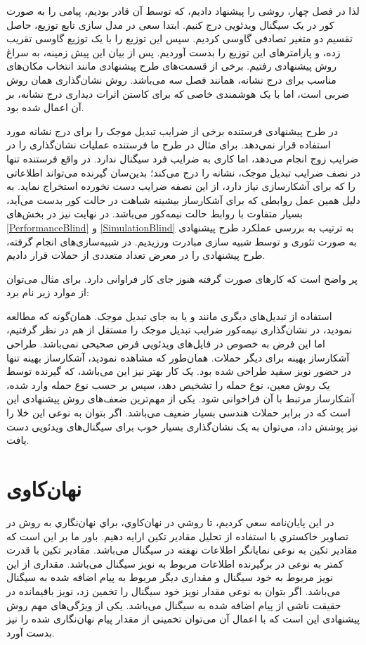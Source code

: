 لذا در فصل چهار، روشی را پیشنهاد دادیم، که توسط آن قادر بودیم، پیامی را به صورت کور در یک سیگنال ویدئویی درج کنیم. ابتدا سعی در مدل سازی تابع توزیع، حاصل تقسیم دو متغیر تصادفی گاوسی کردیم. سپس  این توزیع را با یک توزیع گاوسی تقریب زده، و پارامترهای این توزیع را بدست آوردیم. پس از بیان این پیش زمینه، به سراغ روش پیشنهادی رفتیم. برخی از قسمت‌های طرح پیشنهادی مانند انتخاب مکان‌های مناسب برای درج نشانه، همانند فصل سه می‌باشد. روش نشان‌گذاری همان روش ضربی است، اما با یک هوشمندی خاصی که برای کاستن اثرات دیداری درج نشانه، بر آن اعمال شده بود.

در طرح پیشنهادی فرستنده برخی از ضرایب تبدیل موجک را برای درج نشانه مورد استفاده قرار نمی‌دهد. برای مثال در طرح ما فرستنده عملیات نشان‌گذاری را در ضرایب زوج انجام می‌دهد، اما کاری به ضرایب فرد سیگنال ندارد. در واقع  فرستنده تنها در نصف ضرایب تبدیل موجک، نشانه را درج می‌کند؛ بدین‌سان گیرنده می‌تواند اطلاعاتی را که برای آشکارسازی نیاز دارد، از این نصفه ضرایب دست نخورده استخراج نماید. به دلیل همین عمل روابطی که برای آشکارساز بیشینه شباهت در حالت کور بدست می‌آید، بسیار متفاوت با روابط حالت نیمه‌کور می‌باشد. 
در نهایت نیز در بخش‌های {\ref{PerformanceBlind}} و {\ref{SimulationBlind}} به ترتیب به بررسی عملکرد طرح پیشنهادی به صورت تئوری و توسط شبیه سازی مبادرت ورزیدیم. در شبیه‌سازی‌های انجام گرفته، طرح پیشنهادی را در معرض تعداد متعددی از حملات قرار دادیم. 

پر واضح است که کارهای صورت گرفته هنوز جای کار فراوانی دارد. برای مثال می‌توان از موارد زیر نام برد:
\begin{itemize}
\incl
استفاده از تبدیل‌های دیگری مانند {} و یا {} به جای تبدیل موجک.
\incl
همان‌گونه که مطالعه نمودید، در نشان‌گذاری نیمه‌کور ضرایب تبدیل موجک را مستقل از هم در نظر گرفتیم، اما این فرض به خصوص در فایل‌های ویدئویی فرض صحیحی نمی‌باشد.
\incl
طراحی آشکارساز بهینه برای دیگر حملات. همان‌طور که مشاهده نمودید، آشکارساز بهینه تنها در حضور نویز سفید طراحی شده بود. یک کار بهتر نیز این می‌باشد، که گیرنده توسط یک روش معین، نوع حمله را تشخیص دهد، سپس بر حسب نوع حمله وارد شده، آشکارساز مرتبط با آن فراخوانی شود. 
\incl
یکی از مهم‌ترین ضعف‌های روش پیشنهادی این است که در برابر حملات هندسی بسیار ضعیف می‌باشد. اگر بتوان به نوعی این خلا را نیز پوشش داد، می‌توان به یک نشان‌گذاری بسیار خوب برای سیگنال‌های ویدئویی دست یافت. 
\end{itemize}


\section{نهان‌کاوی}
در اين پایان‌نامه سعي کردیم، تا روشي در نهان‌کاوي، براي نهان‌نگاري به روش {} در تصاوير خاکستري با استفاده از تحليل مقادير تکين ارايه دهيم.  باور ما بر این است که مقادیر تکین به نوعی نمایانگر اطلاعات نهفته در سیگنال می‌باشد. مقادیر تکین با قدرت کمتر به نوعی در برگیرنده اطلاعات مربوط به نویز سیگنال می‌باشد. مقداری از این نویز مربوط به خود سیگنال و مقداری دیگر مربوط به پیام اضافه شده به سیگنال می‌باشد. اگر بتوان به نوعی مقدار نویز خود سیگنال را تخمین زد، نویز باقیمانده در حقیقت ناشی از پیام اضافه شده به سیگنال می‌باشد. یکی از ویژگی‌های مهم روش پیشنهادی این است که با اعمال آن می‌توان تخمینی از مقدار پیام نهان‌نگاری شده را نیز بدست آورد. 

